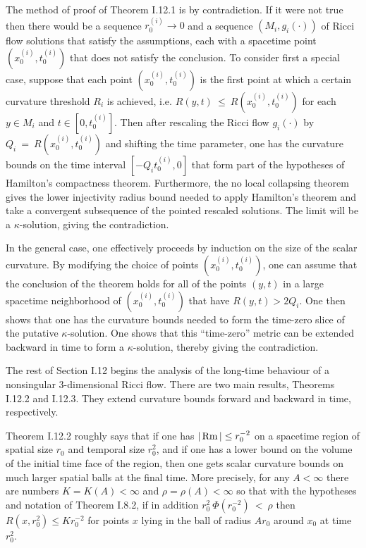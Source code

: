 The method of proof of Theorem I.12.1 is by contradiction. If it were not
true then there would be a sequence $r_0^{(i)} \rightarrow 0$ and
a sequence
$(M_i, g_i(\cdot))$ of
Ricci flow solutions that satisfy the assumptions, each with a spacetime point
$\left( x^{(i)}_0, t^{(i)}_0 \right)$ that does not satisfy the conclusion. To consider
first a special
case,
suppose that each point $\left( x^{(i)}_0, t^{(i)}_0 \right)$
is the first point at which a certain curvature threshold $R_i$ is
achieved, i.e.
$R(y, t) \: \le \: R \left( x^{(i)}_0, t^{(i)}_0 \right)$ for each
$y \in M_i$ and $t \in \left[ 0,  t^{(i)}_0 \right]$.
Then after rescaling the Ricci flow
$g_i(\cdot)$ by $Q_i \: = \: R \left( x^{(i)}_0, t^{(i)}_0 \right)$ and shifting the
time parameter, one has the curvature bounds on the time interval
$[- Q_i t^{(i)}_0,0]$ that form part of  the
hypotheses of Hamilton's compactness theorem.  Furthermore, the
no local collapsing theorem gives the lower injectivity radius bound
needed to apply Hamilton's theorem and take a convergent subsequence of the pointed
rescaled solutions.
The limit will be a $\kappa$-solution, giving the contradiction.

In the general case, one effectively proceeds by induction on the size of the
scalar curvature.  By modifying the choice of points $\left( x^{(i)}_0, t^{(i)}_0 \right)$,
one can assume that the conclusion of the theorem holds for all of the points $(y,t)$ in a
large spacetime neighborhood of $\left( x^{(i)}_0, t^{(i)}_0 \right)$
that have $R(y,t) > 2Q_i$. One then shows that one has the curvature bounds
needed to form the time-zero slice of the putative $\kappa$-solution. One shows
that this ``time-zero'' metric can be extended backward in time to form a
$\kappa$-solution, thereby giving the contradiction.

The rest of Section I.12 begins the analysis of the long-time behaviour of
a nonsingular $3$-dimensional Ricci flow. There are two main results,
Theorems I.12.2 and I.12.3. They extend curvature bounds forward and
backward in time, respectively.

Theorem I.12.2 roughly says that if
one has $|\operatorname{Rm}| \le r_0^{-2}$ on a spacetime region of spatial
size $r_0$ and temporal size $r_0^2$, and if one has a lower bound on the
volume of the initial time face of the region, then one gets scalar curvature
bounds on much larger spatial balls at the final time. More precisely,
for any $A < \infty$
there are numbers $K = K(A) < \infty$ and
$\rho = \rho(A) < \infty$ so that with the
hypotheses and notation of Theorem I.8.2, if in addition
$r_0^2 \: \Phi(r_0^{-2}) \: < \: \rho$
then
$R(x, r_0^2) \le K r_0^{-2}$ for points $x$ lying in the ball of
radius $Ar_0$
around $x_0$
at time $r_0^2$.

